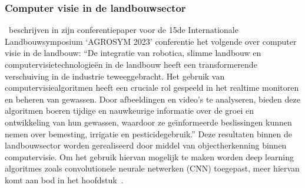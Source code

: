 \subsubsection{Computer visie in de landbouwsector}
\textcite{Radojcic2023}~beschrijven in zijn conferentiepaper voor de 15de Internationale Landbouwsymposium `AGROSYM 2023' conferentie het volgende over computer visie in de landbouw:
``De integratie van robotica, slimme landbouw en computervisietechnologie\"en in de landbouw heeft een transformerende verschuiving in de industrie teweeggebracht.
Het gebruik van computervisiealgoritmen heeft een cruciale rol gespeeld in het realtime monitoren en beheren van gewassen.
Door afbeeldingen en video's te analyseren, bieden deze algoritmen boeren tijdige en nauwkeurige informatie over de groei en ontwikkeling van hun gewassen, waardoor ze ge\"{\i}nformeerde beslissingen kunnen nemen over bemesting, irrigatie en pesticidegebruik.''
Deze resultaten binnen de landbouwsector worden gerealiseerd door middel van objectherkenning binnen computervisie.
Om het gebruik hiervan mogelijk te maken worden deep learning algoritmes zoals convolutionele neurale netwerken (CNN) toegepast, meer hiervan komt aan bod in het hoofdstuk~.

